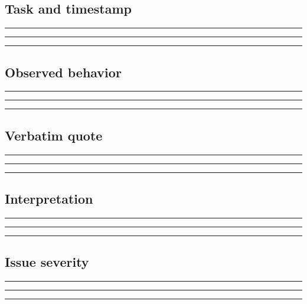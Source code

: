 \documentclass[11pt]{article}
\begin{document}
\subsection{Task and timestamp}
\noindent\rule{\linewidth}{0.3pt}\par\vspace{0.18in}
\noindent\rule{\linewidth}{0.3pt}\par\vspace{0.18in}
\noindent\rule{\linewidth}{0.3pt}\par\vspace{0.14in}

\subsection{Observed behavior}
\noindent\rule{\linewidth}{0.3pt}\par\vspace{0.18in}
\noindent\rule{\linewidth}{0.3pt}\par\vspace{0.18in}
\noindent\rule{\linewidth}{0.3pt}\par\vspace{0.14in}

\subsection{Verbatim quote}
\noindent\rule{\linewidth}{0.3pt}\par\vspace{0.18in}
\noindent\rule{\linewidth}{0.3pt}\par\vspace{0.18in}
\noindent\rule{\linewidth}{0.3pt}\par\vspace{0.14in}

\subsection{Interpretation}
\noindent\rule{\linewidth}{0.3pt}\par\vspace{0.18in}
\noindent\rule{\linewidth}{0.3pt}\par\vspace{0.18in}
\noindent\rule{\linewidth}{0.3pt}\par\vspace{0.14in}

\subsection{Issue severity}
\noindent\rule{\linewidth}{0.3pt}\par\vspace{0.18in}
\noindent\rule{\linewidth}{0.3pt}\par\vspace{0.18in}
\noindent\rule{\linewidth}{0.3pt}\par\vspace{0.14in}
\end{document}

